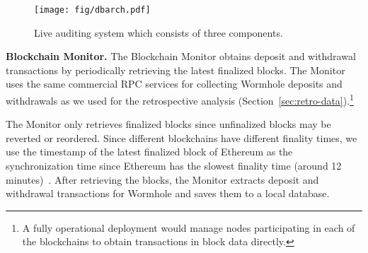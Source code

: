 \begin{figure}[t]
\centering
\texttt{[image: fig/dbarch.pdf]}
\caption{Live auditing system which consists of three components.}
\label{fig:live-audit-arch}
\end{figure}

\textbf{Blockchain Monitor.}
%
The Blockchain Monitor obtains deposit and withdrawal transactions by
periodically retrieving the latest finalized blocks.  The Monitor
uses the same commercial RPC services for collecting
Wormhole deposits and withdrawals as we used for the retrospective
analysis (Section~\ref{sec:retro-data}).\footnote{A fully operational
deployment would manage nodes participating in each of the blockchains
to obtain transactions in block data directly.}

The Monitor only retrieves finalized blocks since unfinalized blocks
may be reverted or reordered.  Since different blockchains have
different finality times, we use the timestamp of the latest finalized
block of Ethereum as the synchronization time since Ethereum has the
slowest finality time (around 12 minutes)~\cite{Finality:online}.
After retrieving the blocks, the Monitor extracts deposit and
withdrawal transactions for Wormhole and saves them to a local
database.

